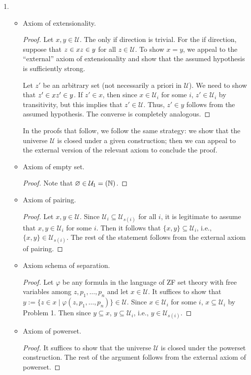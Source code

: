 \documentclass[a4paper]{article}
\newcommand{\N}{\mathbb{N}}
\let\P\relax
\newcommand{\P}{\mathcal{P}}
\newcommand{\U}{\mathcal{U}}
\let\iff\relax
\newcommand{\iff}{\Leftrightarrow}
\begin{document}
\begin{enumerate}
\item
  \begin{itemize}
  \item Axiom of extensionality.
    \begin{proof}
      Let $x,y \in \U$.
      The only if direction is trivial.
      For the if direction, suppose that $z \in x \iff z \in y$ for all $z \in \U$.
      To show $x = y$, we appeal to the ``external'' axiom of extensionality and show that the assumed hypothesis is sufficiently strong.

      Let $z'$ be an arbitrary set (not necessarily a priori in $\U$).
      We need to show that $z' \in x \iff z' \in y$.
      If $z' \in x$, then since $x \in \U_{i}$ for some $i$, $z' \in \U_{i}$ by transitivity, but this implies that $z' \in \U$.
      Thus, $z' \in y$ follows from the assumed hypothesis.
      The converse is completely analogous.
    \end{proof}
    In the proofs that follow, we follow the same strategy: we show that the universe $\U$ is closed under a given construction; then we can appeal to the external version of the relevant axiom to conclude the proof.
  \item Axiom of empty set.
    \begin{proof}
      Note that $\varnothing \in \U_{1} = \P(\N)$.
    \end{proof}
  \item Axiom of pairing.
    \begin{proof}
      Let $x,y \in \U$.
      Since $\U_{i} \subseteq \U_{s(i)}$ for all $i$, it is legitimate to assume that $x,y \in \U_{i}$ for some $i$.
      Then it follows that $\{x,y\} \subseteq \U_{i}$, i.e., $\{x,y\} \in \U_{s(i)}$.
      The rest of the statement follows from the external axiom of pairing.
    \end{proof}
  \item Axiom schema of separation.
    \begin{proof}
      Let $\varphi$ be any formula in the language of ZF set theory with free variables among $z,p_{1},\ldots,p_{n}$ and let $x \in \U$.
      It suffices to show that $y := \{z \in x \mid \varphi(z,p_{1},\ldots,p_{n})\} \in \U$.
      Since $x \in \U_{i}$ for some $i$, $x \subseteq \U_{i}$ by Problem 1.
      Then since $y \subseteq x$, $y \subseteq \U_{i}$, i.e., $y \in \U_{s(i)}$.
    \end{proof}
  \item Axiom of powerset.
    \begin{proof}
      It suffices to show that the universe $\U$ is closed under the powerset construction.
      The rest of the argument follows from the external axiom of powerset.


\end{proof}
\end{itemize}
\end{enumerate}
\end{document}
